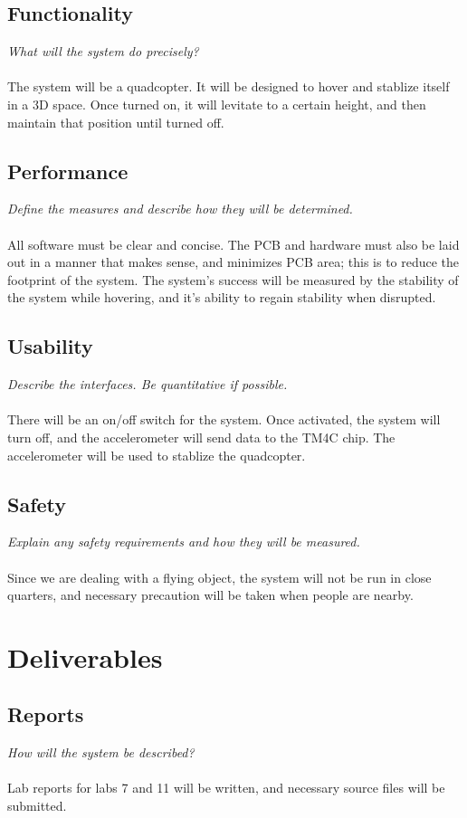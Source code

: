 \documentclass{article}
\begin{document}
\subsection{Functionality}
\textit{What will the system do precisely?}\\ \\
The system will be a quadcopter. It will be designed to hover and stablize itself in a 3D space. Once turned on, it will levitate to a certain height, and then maintain that position until turned off.

\subsection{Performance}
\textit{Define the measures and describe how they will be determined.}\\ \\
All software must be clear and concise. The PCB and hardware must also be laid out in a manner that makes sense, and minimizes PCB area; this is to reduce the footprint of the system. The system's success will be measured by the stability of the system while hovering, and it's ability to regain stability when disrupted.


\subsection{Usability}
\textit{Describe the interfaces. Be quantitative if possible.}\\ \\
There will be an on/off switch for the system. Once activated, the system will turn off, and the accelerometer will send data to the TM4C chip. The accelerometer will be used to stablize the quadcopter.

\subsection{Safety}
\textit{Explain any safety requirements and how they will be measured.}\\ \\
Since we are dealing with a flying object, the system will not be run in close quarters, and necessary precaution will be taken when people are nearby.

\section{Deliverables}

\subsection{Reports}
\textit{How will the system be described?}\\ \\
Lab reports for labs 7 and 11 will be written, and necessary source files will be submitted.
\end{document}
